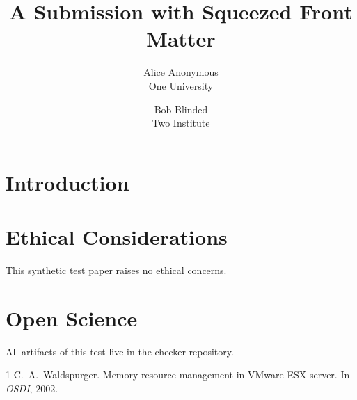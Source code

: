 \documentclass[letterpaper,twocolumn,10pt]{article}
\date{}
\title{\Large \bf A Submission with Squeezed Front Matter}
\author{{\rm Alice Anonymous}\\One University \and {\rm Bob Blinded}\\Two Institute}
\begin{document}
\maketitle

\begin{abstract}
\lipsum[1][1-5]
\end{abstract}

\section{Introduction}
\lipsum[2-4]

\appendix
\section*{Ethical Considerations}
This synthetic test paper raises no ethical concerns.

\section*{Open Science}
All artifacts of this test live in the checker repository.

\begin{thebibliography}{1}
 C.~A.\ Waldspurger. Memory resource management in VMware ESX
  server. In \emph{OSDI}, 2002.
\end{thebibliography}
\end{document}
